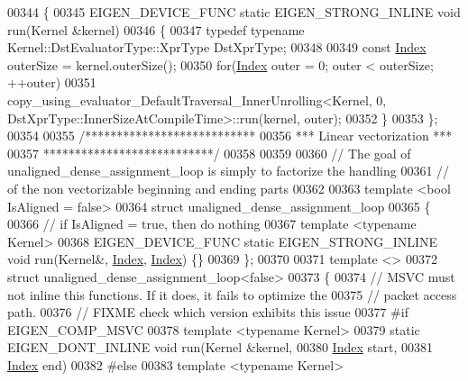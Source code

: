 \begin{DoxyCode}
00344 \{
00345   EIGEN\_DEVICE\_FUNC \textcolor{keyword}{static} EIGEN\_STRONG\_INLINE \textcolor{keywordtype}{void} run(Kernel &kernel)
00346   \{
00347     \textcolor{keyword}{typedef} \textcolor{keyword}{typename} Kernel::DstEvaluatorType::XprType DstXprType;
00348 
00349     \textcolor{keyword}{const} \hyperlink{namespace_eigen_a62e77e0933482dafde8fe197d9a2cfde}{Index} outerSize = kernel.outerSize();
00350     \textcolor{keywordflow}{for}(\hyperlink{namespace_eigen_a62e77e0933482dafde8fe197d9a2cfde}{Index} outer = 0; outer < outerSize; ++outer)
00351       copy\_using\_evaluator\_DefaultTraversal\_InnerUnrolling<Kernel, 0,
       DstXprType::InnerSizeAtCompileTime>::run(kernel, outer);
00352   \}
00353 \};
00354 
00355 \textcolor{comment}{/***************************}
00356 \textcolor{comment}{*** Linear vectorization ***}
00357 \textcolor{comment}{***************************/}
00358 
00359 
00360 \textcolor{comment}{// The goal of unaligned\_dense\_assignment\_loop is simply to factorize the handling}
00361 \textcolor{comment}{// of the non vectorizable beginning and ending parts}
00362 
00363 \textcolor{keyword}{template} <\textcolor{keywordtype}{bool} IsAligned = false>
00364 \textcolor{keyword}{struct }unaligned\_dense\_assignment\_loop
00365 \{
00366   \textcolor{comment}{// if IsAligned = true, then do nothing}
00367   \textcolor{keyword}{template} <\textcolor{keyword}{typename} Kernel>
00368   EIGEN\_DEVICE\_FUNC \textcolor{keyword}{static} EIGEN\_STRONG\_INLINE \textcolor{keywordtype}{void} run(Kernel&, \hyperlink{namespace_eigen_a62e77e0933482dafde8fe197d9a2cfde}{Index}, 
      \hyperlink{namespace_eigen_a62e77e0933482dafde8fe197d9a2cfde}{Index}) \{\}
00369 \};
00370 
00371 \textcolor{keyword}{template} <>
00372 \textcolor{keyword}{struct }unaligned\_dense\_assignment\_loop<false>
00373 \{
00374   \textcolor{comment}{// MSVC must not inline this functions. If it does, it fails to optimize the}
00375   \textcolor{comment}{// packet access path.}
00376   \textcolor{comment}{// FIXME check which version exhibits this issue}
00377 \textcolor{preprocessor}{#if EIGEN\_COMP\_MSVC}
00378   \textcolor{keyword}{template} <\textcolor{keyword}{typename} Kernel>
00379   \textcolor{keyword}{static} EIGEN\_DONT\_INLINE \textcolor{keywordtype}{void} run(Kernel &kernel,
00380                                     \hyperlink{namespace_eigen_a62e77e0933482dafde8fe197d9a2cfde}{Index} start,
00381                                     \hyperlink{namespace_eigen_a62e77e0933482dafde8fe197d9a2cfde}{Index} end)
00382 \textcolor{preprocessor}{#else}
00383   \textcolor{keyword}{template} <\textcolor{keyword}{typename} Kernel>

\end{DoxyCode}
